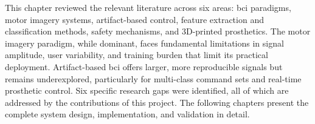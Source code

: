 This chapter reviewed the relevant literature across six areas:
\acrshort{bci} paradigms, motor imagery systems, artifact-based
control, feature extraction and classification methods, safety
mechanisms, and 3D-printed prosthetics. The motor imagery paradigm,
while dominant, faces fundamental limitations in signal amplitude,
user variability, and training burden that limit its practical
deployment. Artifact-based \acrshort{bci} offers larger, more
reproducible signals but remains underexplored, particularly for
multi-class command sets and real-time prosthetic control. Six
specific research gaps were identified, all of which are addressed
by the contributions of this project. The following chapters present
the complete system design, implementation, and validation in detail.
